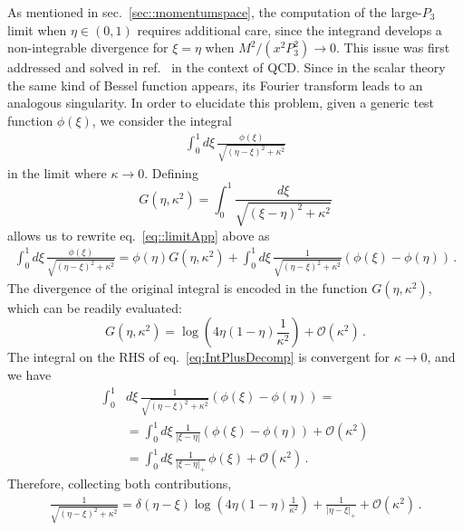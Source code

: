 As mentioned in sec.~\ref{sec::momentumspace}, the computation of the
large-$P_3$ limit when $\eta \in \left(0,1\right)$ requires additional care,
since the integrand develops a non-integrable divergence for $\xi=\eta$ when
$M^2/(x^2P_3^2) \to 0$. This issue was first addressed and solved in ref.~\cite{Radyushkin:2017lvu} in the context of QCD.
Since in the scalar theory the same kind of Bessel function appears, its Fourier transform leads to an analogous singularity. 
In order to elucidate this problem, given a generic test
function $\phi\left(\xi\right)$, we consider the integral
\begin{align}
    \label{eq::limitApp}
        \int_0^1 d\xi\,
        \frac{\phi\left(\xi\right)}{\sqrt{\left(\eta-\xi\right)^2 + \kappa^2}}
\end{align}
in the limit where $\kappa\to 0$. Defining 
\begin{equation}
    \label{eq:GfunDef}
    G\left(\eta, \kappa^2\right) = 
    \int_0^1 \frac{d\xi}{\sqrt{\left(\xi - \eta\right)^2 + \kappa^2}}
\end{equation}
allows us to rewrite eq.~\eqref{eq::limitApp} above as 
\begin{align}
    \label{eq:IntPlusDecomp}
    \int_0^1 d\xi\,
    \frac{\phi\left(\xi\right)}{\sqrt{\left(\eta-\xi\right)^2 + \kappa^2}}
    = \phi(\eta) G\left(\eta, \kappa^2\right) + 
    \int_0^1 d\xi\,
    \frac{1}{\sqrt{\left(\eta-\xi\right)^2 + \kappa^2}}
    \left(\phi\left(\xi\right)-\phi\left(\eta\right)\right)\, .
\end{align}
The divergence of the original integral is encoded in the function
$G\left(\eta,\kappa^2\right)$, which can be readily evaluated:
\begin{equation}
    \label{eq:GfunIntegral}
    G\left(\eta, \kappa^2\right) =
    \log \left(4\eta\left(1-\eta\right)\frac{1}{\kappa^2}\right) +
    \mathcal O\left(\kappa^2\right)\, .
\end{equation}
The integral on the RHS of eq.~\eqref{eq:IntPlusDecomp} is convergent for $\kappa\to
0$, and we have
\begin{align}
    \int_0^1 & d\xi\, 
    \frac{1}{\sqrt{\left(\eta-\xi\right)^2 + \kappa^2}} 
    \left(\phi\left(\xi\right)-\phi\left(\eta\right)\right) = 
    \nonumber \\
    &= \int_0^1 d\xi\, 
    \frac{1}{\left| \xi - \eta\right|}
    \left(\phi\left(\xi\right)-\phi\left(\eta\right)\right) 
    + \mathcal{O}(\kappa^2) \nonumber \\
    \label{eq:PlusDistrLimit}
    &= \int_0^1 d\xi\,
    \frac{1}{\left| \xi - \eta\right|_+}\,
    \phi\left(\xi\right) 
    + \mathcal{O}(\kappa^2) \, .
\end{align}
Therefore, collecting both contributions, 
\begin{align}
    \frac{1}{\sqrt{(\eta - \xi)^2 + \kappa^2}} = 
    \delta(\eta - \xi) \log\left(4\eta (1-\eta) \frac{1}{\kappa^2}\right)
    + \frac{1}{\left|\eta - \xi\right|_+} + \mathcal{O}\left(\kappa^2\right)\, .
\end{align}

